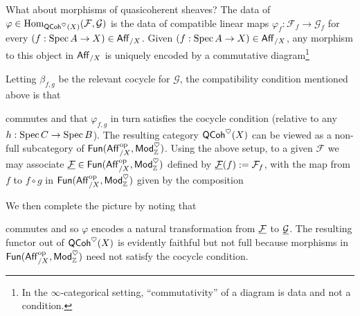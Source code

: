 \documentclass[11pt]{article}
\newcommand{\FF}{\mathcal{F}}
\newcommand{\GG}{\mathcal{G}}
\renewcommand{\phi}{\varphi}
\begin{document}
What about morphisms of quasicoherent sheaves? The data of $\phi\in\Hom_{\QCoh^{\heart}(X)}(\FF,\GG)$ is the data of compatible linear maps $\phi_f: \FF_f\to\GG_f$ for every $(f: \operatorname{Spec} A\to X)\in\operatorname{\mathsf{Aff}}_{/X}$. Given $(f: \operatorname{Spec} A\to X)\in\operatorname{\mathsf{Aff}}_{/X}$, any morphism to this object in $\operatorname{\mathsf{Aff}}_{/X}$ is uniquely encoded by a commutative diagram\footnote{In the $\infty$-categorical setting, ``commutativity'' of a diagram is data and not a condition.}
\begin{center}
\end{center}
Letting $\beta_{f,g}$ be the relevant cocycle for $\GG$, the compatibility condition mentioned above is that
\begin{center}
\end{center}
commutes and that $\phi_{f,g}$ in turn satisfies the cocycle condition (relative to any $h: \operatorname{Spec} C\to\operatorname{Spec} B$). The resulting category $\operatorname{\mathsf{QCoh}}^{\heartsuit}(X)$ can be viewed as a non-full subcategory of $\operatorname{\mathsf{Fun}}(\operatorname{\mathsf{Aff}}_{/X}^{\operatorname{op}},\operatorname{\mathsf{Mod}}_{\mathbb{Z}}^{\heartsuit})$. Using the above setup, to a given $\FF$ we may associate $\un{\FF}\in\Fun(\Aff_{/X}^{\op},\Mod_{\Z}^{\heart})$ defined by $\un{\FF}(f):=\FF_f$, with the map from $f$ to $f\circ g$ in $\operatorname{\mathsf{Fun}}(\operatorname{\mathsf{Aff}}_{/X}^{\operatorname{op}},\operatorname{\mathsf{Mod}}_{\mathbb{Z}}^{\heartsuit})$ given by the composition 
\begin{center}
\end{center}
We then complete the picture by noting that
\begin{center}
\end{center}
commutes and so $\phi$ encodes a natural transformation from $\un{\FF}$ to $\un{\GG}$. The resulting functor out of $\operatorname{\mathsf{QCoh}}^{\heartsuit}(X)$ is evidently faithful but not full because morphisms in $\operatorname{\mathsf{Fun}}(\operatorname{\mathsf{Aff}}_{/X}^{\operatorname{op}},\operatorname{\mathsf{Mod}}_{\mathbb{Z}}^{\heartsuit})$ need not satisfy the cocycle condition.
\end{document}
